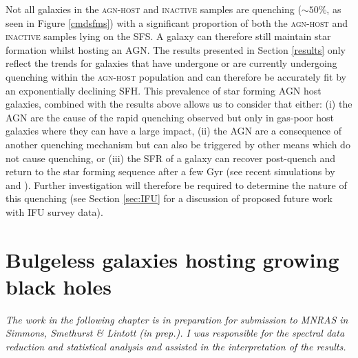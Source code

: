 Not all galaxies in the \textsc{agn-host} and \textsc{inactive} samples are quenching ($\sim50\%$, as seen in Figure \ref{cmdsfms}) with a significant proportion of both the \textsc{agn-host} and \textsc{inactive} samples lying on the SFS. A galaxy can therefore still maintain star formation whilst hosting an AGN. The results presented in Section \ref{results} only reflect the trends for galaxies that have undergone or are currently undergoing quenching within the \textsc{agn-host} population and can therefore be accurately fit by an exponentially declining SFH. This prevalence of star forming AGN host galaxies, combined with the results above allows us to consider that either: (i)  the AGN are the cause of the rapid quenching observed but only in gas-poor host galaxies where they can have a large impact, (ii) the AGN are a consequence of another quenching mechanism but can also be triggered by other means which do not cause quenching, or (iii) the SFR of a galaxy can recover post-quench and return to the star forming sequence after a few Gyr (see recent simulations by \citealt{pontzen16} and \citealt{sparre16}). Further investigation will therefore be required to determine the nature of this quenching (see Section \ref{sec:IFU} for a discussion of proposed future work with IFU survey data).


 

\newpage

\section{Bulgeless galaxies hosting growing black holes}\label{sec:intbulgeless}

\emph{The work in the following chapter is in preparation for submission to MNRAS in Simmons, Smethurst \& Lintott (in prep.). I was responsible for the spectral data reduction and statistical analysis and assisted in the interpretation of the results.}

